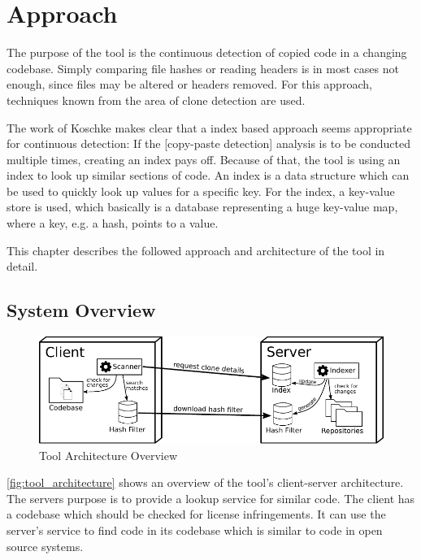 
\chapter{Approach}\label{chapter:approach}
The purpose of the tool is the continuous detection of copied code in a changing codebase.
Simply comparing file hashes or reading headers is in most cases not enough, since files may be altered or headers removed.
For this approach, techniques known from the area of clone detection are used.

The work of Koschke makes clear that a index based approach seems appropriate for continuous detection:
\glqq If the [copy-paste detection] analysis is to be conducted multiple times, creating an index pays off\grqq \cite{koschke2014large}.
Because of that, the tool is using an index to look up similar sections of code.
An index is a data structure which can be used to quickly look up values for a specific key.
For the index, a key-value store is used, which basically is a database representing a huge key-value map, where a key, e.g. a hash, points to a value.

This chapter describes the followed approach and architecture of the tool in detail.

\section{System Overview}
\begin{figure}[h]
	\centering
	\includegraphics[width=\linewidth]{figures/architecture_overview.pdf}
	\caption{Tool Architecture Overview}\label{fig:tool_architecture}
\end{figure}
\autoref{fig:tool_architecture} shows an overview of the tool's client-server architecture.
The servers purpose is to provide a lookup service for similar code.
The client has a codebase which should be checked for license infringements.
It can use the server's service to find code in its codebase which is similar to code in open source systems.

